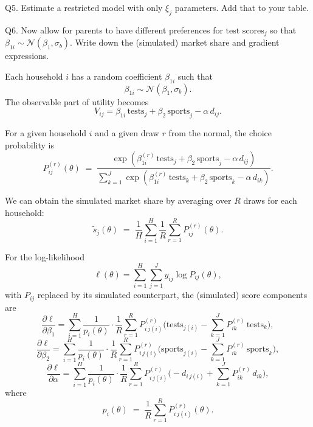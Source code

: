 \documentclass{article}
\begin{document}
\begin{tcolorbox}
Q5. Estimate a restricted model with only $\xi_j$ parameters. Add that to your table.
\end{tcolorbox}

\begin{table}[H]
\centering
{}
\caption{Estimation results for logit models.}
\end{table}

\begin{tcolorbox}
Q6. Now allow for parents to have different preferences for $\text{test scores}_j$ so that $\beta_{1i} \sim \mathcal{N}(\beta_1, \sigma_b)$. Write down the (simulated) market share and gradient expressions.
\end{tcolorbox}

Each household $i$ has a random coefficient $\beta_{1i}$ such that
\[
\beta_{1i} \sim \mathcal{N}(\beta_1,\sigma_b).
\]
The observable part of utility becomes
\[
V_{ij} = \beta_{1i}\,\text{tests}_j + \beta_2\,\text{sports}_j - \alpha\,d_{ij}.
\]

For a given household $i$ and a given draw $r$ from the normal, the choice probability is
\[
P_{ij}^{(r)}(\theta) \;=\; \frac{\exp\!\left(\beta_{1i}^{(r)}\,\text{tests}_j + \beta_2\,\text{sports}_j - \alpha\,d_{ij}\right)}
{\sum_{k=1}^J \exp\!\left(\beta_{1i}^{(r)}\,\text{tests}_k + \beta_2\,\text{sports}_k - \alpha\,d_{ik}\right)}.
\]

We can obtain the simulated market share by averaging over $R$ draws for each household:
\[
\tilde s_j(\theta) \;=\; \frac{1}{H}\sum_{i=1}^H \frac{1}{R} \sum_{r=1}^R P_{ij}^{(r)}(\theta).
\]

For the log-likelihood
\[
\ell(\theta)=\sum_{i=1}^H\sum_{j=1}^J y_{ij}\log P_{ij}(\theta),
\]
with $P_{ij}$ replaced by its simulated counterpart, the (simulated) score components are
\[
\frac{\partial \ell}{\partial \beta_1}
=\sum_{i=1}^H \frac{1}{p_i(\theta)}\cdot\frac{1}{R}\sum_{r=1}^R 
P_{i\,j(i)}^{(r)}\Big( \text{tests}_{j(i)} - \sum_{k=1}^J P_{ik}^{(r)}\,\text{tests}_k \Big),
\]
\[
\frac{\partial \ell}{\partial \beta_2}
=\sum_{i=1}^H \frac{1}{p_i(\theta)}\cdot\frac{1}{R}\sum_{r=1}^R 
P_{i\,j(i)}^{(r)}\Big( \text{sports}_{j(i)} - \sum_{k=1}^J P_{ik}^{(r)}\,\text{sports}_k \Big),
\]
\[
\frac{\partial \ell}{\partial \alpha}
=\sum_{i=1}^H \frac{1}{p_i(\theta)}\cdot\frac{1}{R}\sum_{r=1}^R 
P_{i\,j(i)}^{(r)}\Big( -d_{i\,j(i)} + \sum_{k=1}^J P_{ik}^{(r)}\,d_{ik} \Big),
\]
where 
\[
p_i(\theta) \;=\; \frac{1}{R}\sum_{r=1}^R P_{i\,j(i)}^{(r)}(\theta).
\]
\end{document}

